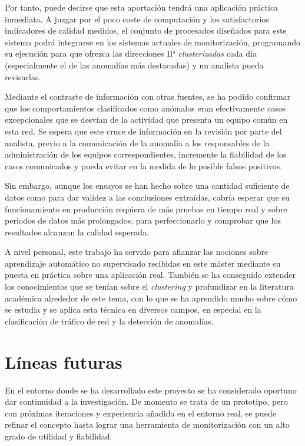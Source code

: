 Por tanto, puede decirse que esta aportación tendrá una aplicación práctica inmediata.
A juzgar por el poco coste de computación y los satisfactorios indicadores de calidad medidos,
el conjunto de procesados diseñados para este sistema podrá integrarse en los sistemas actuales de monitorización,
programando su ejecución para que ofrezca las direcciones IP \emph{clusterizadas} cada día (especialmente el de las anomalías más destacadas) y un analista pueda revisarlas.

Mediante el contraste de información con otras fuentes, se ha podido confirmar que los comportamientos clasificados como anómalos
eran efectivamente casos excepcionales que se desvían de la actividad que presenta un equipo común en esta red.
Se espera que este cruce de información en la revisión por parte del analista, previo a la comunicación de la anomalía a los responsables de la administración de los equipos correspondientes,
incremente la fiabilidad de los casos comunicados y pueda evitar en la medida de lo posible falsos positivos.

Sin embargo, aunque los ensayos se han hecho sobre una cantidad suficiente de datos como para dar validez a las conclusiones extraídas,
cabría esperar que su funcionamiento en producción requiera de más pruebas en tiempo real y sobre periodos de datos más prolongados,
para perfeccionarlo y comprobar que los resultados alcanzan la calidad esperada.

A nivel personal, este trabajo ha servido para afianzar las nociones sobre aprendizaje automático no supervisado recibidas en este máster mediante su puesta en práctica sobre una aplicación real.
También se ha conseguido extender los conocimientos que se tenían sobre el \emph{clustering} y profundizar en la literatura académica alrededor de este tema,
con lo que se ha aprendido mucho sobre cómo se estudia y se aplica esta técnica en diversos campos, en especial en la clasificación de tráfico de red y la detección de anomalías.

\section{Líneas futuras}\label{sec:lineasfuturas}

En el entorno donde se ha desarrollado este proyecto se ha considerado oportuno dar continuidad a la investigación.
De momento se trata de un prototipo, pero con próximas iteraciones y experiencia añadida en el entorno real,
se puede refinar el concepto hasta lograr una herramienta de monitorización con un alto grado de utilidad y fiabilidad.

